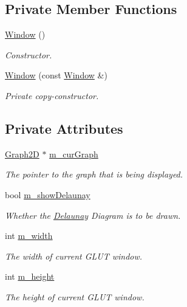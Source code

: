 \subsection*{Private Member Functions}
\begin{DoxyCompactItemize}
\item 
\hyperlink{classcmst_1_1_window_a2f0377f780b0dec7f9ca43145d98e8d1}{Window} ()
\begin{DoxyCompactList}\small\item\em Constructor. \end{DoxyCompactList}\item 
\hyperlink{classcmst_1_1_window_a3a06a150faa316137c794be5acac4979}{Window} (const \hyperlink{classcmst_1_1_window}{Window} \&)
\begin{DoxyCompactList}\small\item\em Private copy-\/constructor. \end{DoxyCompactList}\end{DoxyCompactItemize}
\subsection*{Private Attributes}
\begin{DoxyCompactItemize}
\item 
\hyperlink{classcmst_1_1_graph2_d}{Graph2D} $\ast$ \hyperlink{classcmst_1_1_window_a86d6a605ac3dc593de030802009e73bc}{m\+\_\+cur\+Graph}
\begin{DoxyCompactList}\small\item\em The pointer to the graph that is being displayed. \end{DoxyCompactList}\item 
bool \hyperlink{classcmst_1_1_window_a527a10c574abe1ad1e0279465b07a7f0}{m\+\_\+show\+Delaunay}
\begin{DoxyCompactList}\small\item\em Whether the \hyperlink{class_delaunay}{Delaunay} Diagram is to be drawn. \end{DoxyCompactList}\item 
int \hyperlink{classcmst_1_1_window_a2955f1032cf2ab577a5f01776e46f671}{m\+\_\+width}
\begin{DoxyCompactList}\small\item\em The width of current G\+L\+UT window. \end{DoxyCompactList}\item 
int \hyperlink{classcmst_1_1_window_a9447754382ddb8894d50a40d19f027a3}{m\+\_\+height}
\begin{DoxyCompactList}\small\item\em The height of current G\+L\+UT window. \end{DoxyCompactList}\end{DoxyCompactItemize}

